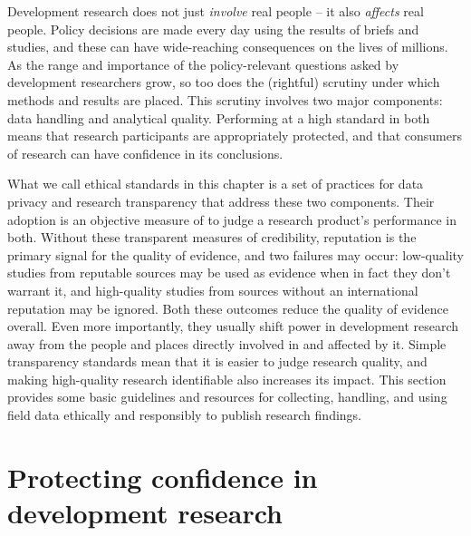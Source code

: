 
\begin{fullwidth}
Development research does not just \textit{involve} real people -- it also \textit{affects} real people.
Policy decisions are made every day using the results of briefs and studies,
and these can have wide-reaching consequences on the lives of millions.
As the range and importance of the policy-relevant questions
asked by development researchers grow,
so too does the (rightful) scrutiny under which methods and results are placed.
This scrutiny involves two major components: data handling and analytical quality.
Performing at a high standard in both means that research participants
are appropriately protected,
and that consumers of research can have confidence in its conclusions.

What we call ethical standards in this chapter is a set of practices for data privacy and research transparency that address these two components.
Their adoption is an objective measure of to judge a research product's performance in both.
Without these transparent measures of credibility, reputation is the primary signal for the quality of evidence, and two failures may occur:
low-quality studies from reputable sources may be used as evidence when in fact they don't warrant it,
and high-quality studies from sources without an international reputation may be ignored.
Both these outcomes reduce the quality of evidence overall.
Even more importantly, they usually shift power in development research
away from the people and places directly involved in and affected by it.
Simple transparency standards mean that it is easier to judge research quality, and making high-quality research identifiable also increases its impact.
This section provides some basic guidelines and resources
for collecting, handling, and using field data ethically and responsibly to publish research findings.
\end{fullwidth}


\section{Protecting confidence in development research}

